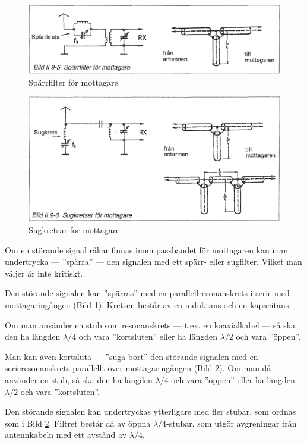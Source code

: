 \begin{figure}
  \includegraphics[width=\textwidth]{images/bild_2_9-05}
  \caption{Spärrfilter för mottagare}
  \label{fig:bildII9-5}
\end{figure}

\begin{figure}
  \includegraphics[width=\textwidth]{images/bild_2_9-06}
  \caption{Sugkretsar för mottagare}
  \label{fig:bildII9-6}
\end{figure}

Om en störande signal råkar finnas inom passbandet för mottagaren kan
man undertrycka --- ''spärra'' --- den signalen med ett spärr- eller
sugfilter. Vilket man väljer är inte kritiskt.

Den störande signalen kan ''spärras'' med en parallellresonanskrets i
serie med mottagaringången (Bild \ref{fig:bildII9-5}). Kretsen består av en
induktans och en kapacitans.

Om man använder en stub som resonanskrets --- t.ex. en koaxialkabel --- så
ska den ha längden \(\lambda/4\) och vara ''kortsluten'' eller ha
längden \(\lambda/2\) och vara ''öppen''.

Man kan även kortsluta --- ''suga bort'' den störande signalen med en
serieresonanskrets parallellt över mottagaringången (Bild \ref{fig:bildII9-6}). Om
man då använder en stub, så ska den ha längden \(\lambda/4\) och
vara ''öppen'' eller ha längden \(\lambda/2\) och vara ''kortsluten''.

Den störande signalen kan undertryckas ytterligare med fler stubar,
som ordnas som i Bild \ref{fig:bildII9-6}. Filtret består då av öppna
\(\lambda/4\)-stubar, som utgör avgreningar från antennkabeln med ett
avstånd av \(\lambda/4\).


